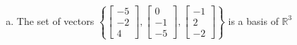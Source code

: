 \begin{exerciseAnswer}
\begin{enumerate}[(a)]
\item The set of vectors \( \left\{ \left[\begin{array}{c}
-5 \\
-2 \\
4
\end{array}\right] , \left[\begin{array}{c}
0 \\
-1 \\
-5
\end{array}\right] , \left[\begin{array}{c}
-1 \\
2 \\
-2
\end{array}\right] \right\} \) is a basis of \(\mathbb{R}^3\)
\end{enumerate}
    
\end{exerciseAnswer}
    
